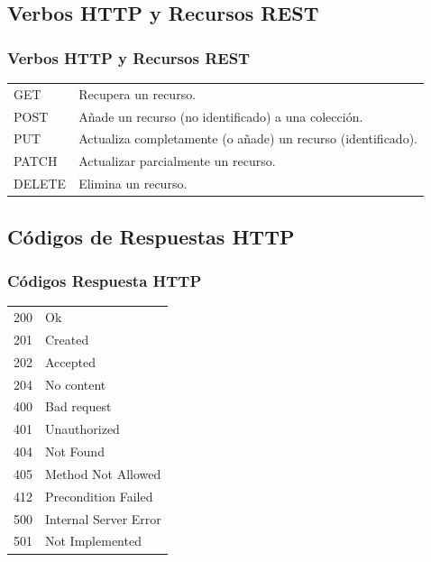 \documentclass[a4paper,slidestop,xcolor=pst,blue]{beamer}
\begin{document}
\subsection{Verbos HTTP y Recursos REST}

\begin{frame}[c]
    \frametitle{Verbos HTTP y Recursos REST}
    \begin{tabular}{ll} \hline
        GET    & Recupera un recurso. \\
        POST   & Añade un recurso (no identificado) a una colección. \\
        PUT    & Actualiza completamente (o añade) un recurso (identificado). \\
        PATCH  & Actualizar parcialmente un recurso. \\
        DELETE & Elimina un recurso. \\ \hline
    \end{tabular}
\end{frame}

\subsection{Códigos de Respuestas HTTP}

\begin{frame}[c]
    \frametitle{Códigos Respuesta HTTP}
    \begin{center}
        \begin{tabular}{ll}
            \hline
            200 & Ok         \\   
            201 & Created    \\  
            202 & Accepted   \\  
            204 & No content \\ 
            \hline
            400 & Bad request         \\
            401 & Unauthorized        \\   
            404 & Not Found           \\
            405 & Method Not Allowed  \\
            412 & Precondition Failed \\
            \hline
            500 & Internal Server Error \\
            501 & Not Implemented       \\
            \hline            
        \end{tabular}
    \end{center}
\end{frame}
\end{document}

